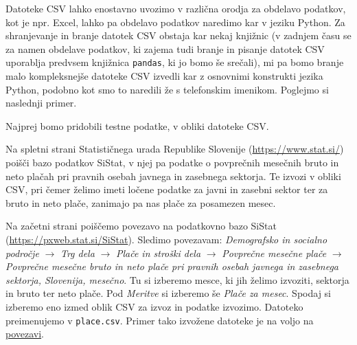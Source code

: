 Datoteke CSV lahko enostavno uvozimo v različna orodja za obdelavo podatkov, kot je npr. Excel, lahko pa obdelavo podatkov naredimo kar v jeziku Python. Za shranjevanje in branje datotek CSV obstaja kar nekaj knjižnic (v zadnjem času se za namen obdelave podatkov, ki zajema tudi branje in pisanje datotek CSV uporablja predvsem knjižnica \texttt{pandas}, ki jo bomo še srečali), mi pa bomo branje malo kompleksnejše datoteke CSV izvedli kar z osnovnimi konstrukti jezika Python, podobno kot smo to naredili že s telefonskim imenikom. Poglejmo si naslednji primer. 

Najprej bomo pridobili testne podatke, v obliki datoteke CSV.
\begin{zgled}
Na spletni strani Statističnega urada Republike Slovenije (\url{https://www.stat.si/}) poišči bazo podatkov SiStat, v njej pa podatke o povprečnih mesečnih bruto in neto plačah pri pravnih osebah javnega in zasebnega sektorja. Te izvozi v obliki CSV, pri čemer želimo imeti ločene podatke za javni in zasebni sektor ter za bruto in neto plače, zanimajo pa nas plače za posamezen mesec.
\end{zgled}

\begin{resitev}
Na začetni strani poiščemo povezavo na podatkovno bazo SiStat\\ (\url{https://pxweb.stat.si/SiStat}). Sledimo povezavam: \emph{Demografsko in socialno področje} $\rightarrow$ \emph{Trg dela} $\rightarrow$ \emph{Plače in stroški dela} $\rightarrow$ \emph{Povprečne mesečne plače} $\rightarrow$ \emph{Povprečne mesečne bruto in neto plače pri pravnih osebah javnega in zasebnega sektorja, Slovenija, mesečno}. Tu si izberemo mesce, ki jih želimo izvoziti, sektorja in bruto ter neto plače. Pod \emph{Meritve} si izberemo še \emph{Plače za mesec}. Spodaj si izberemo eno izmed oblik CSV za izvoz in podatke izvozimo. Datoteko preimenujemo v \texttt{place.csv}. Primer tako izvožene datoteke je na voljo na \href{https://raw.githubusercontent.com/mmoskon/OP_skripta/master/resitve/place.csv}{povezavi}. 
\end{resitev}

